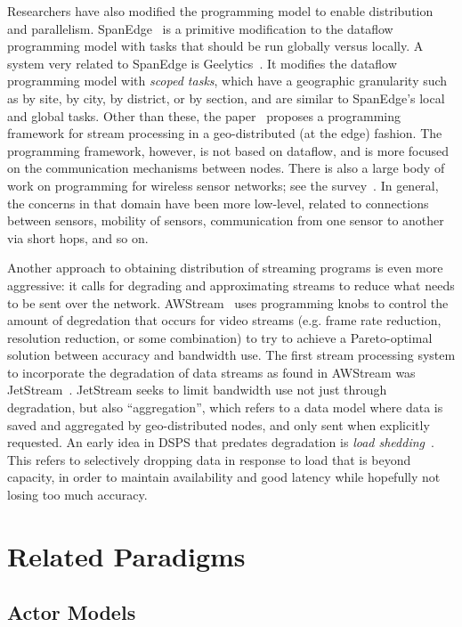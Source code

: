 Researchers have also modified the programming model to enable distribution and parallelism.
SpanEdge~\cite{sajjad2016spanedge} is a primitive modification to the dataflow programming model with tasks that should be run globally versus locally.
A system very related to SpanEdge is Geelytics~\cite{cheng2015geelytics}.
It modifies the dataflow programming model with \emph{scoped tasks}, which have a geographic granularity such as by site, by city, by district, or by section, and are similar to SpanEdge's local and global tasks.
Other than these, the paper~\cite{renart2017datadrivenstreamedge} proposes a programming framework for stream processing in a geo-distributed (at the edge) fashion. The programming framework, however, is not based on dataflow, and is more focused on the communication mechanisms between nodes. There is also a large body of work on programming for wireless sensor networks; see the survey~\cite{mottola2011programming-wsn}. In general, the concerns in that domain have been more low-level, related to connections between sensors, mobility of sensors, communication from one sensor to another via short hops, and so on.

Another approach to obtaining distribution of streaming programs is even more aggressive: it calls for degrading and approximating streams to reduce what needs to be sent over the network.
AWStream~\cite{zhang2018awstream} uses programming knobs to control the amount of degredation that occurs for video streams (e.g. frame rate reduction, resolution reduction, or some combination) to try to achieve a Pareto-optimal solution between accuracy and bandwidth use.
The first stream processing system to incorporate the degradation of data streams as found in AWStream was JetStream~\cite{rabkin2014jetstream}.
JetStream seeks to limit bandwidth use not just through degradation, but also ``aggregation'', which refers to a data model where data is saved and aggregated by geo-distributed nodes, and only sent when explicitly requested.
An early idea in DSPS that predates degradation is \emph{load shedding}~\cite{tatbul2003load,tatbul2007staying}.
This refers to selectively dropping data in response to load that is beyond capacity, in order to maintain availability and good latency while hopefully not losing too much accuracy.

\section{Related Paradigms}

\subsection{Actor Models}

